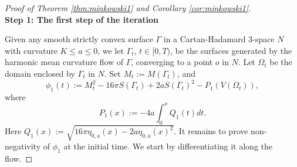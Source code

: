 \documentclass[11pt]{amsart}
\theoremstyle{definition}
\theoremstyle{remark}
\numberwithin{equation}{section}
\begin{document}
\begin{proof}[Proof of Theorem \ref{thm:minkowski1} and Corollary \ref{cor:minkowski1}]
	\hfill\\
	\textbf{Step 1: The first step of the iteration}
	
	Given any smooth strictly convex surface $\Gamma$ in a Cartan-Hadamard 3-space $N$ with curvature $K\leq a\leq 0$, we let $\Gamma_t$, $t\in[0,T)$, be the surfaces generated by the harmonic mean curvature flow of $\Gamma$, converging to a point $o$ in $N$. Let $\Omega_t$ be the domain enclosed by $\Gamma_t$ in $N$.
	Set $M_t:=M(\Gamma_t)$, and
	$$
	\phi_1(t):= M_t^2-16\pi S(\Gamma_t) +2a S(\Gamma_t)^2 -  P_1(V(\Omega_t)) ,
	$$
	where 
	\begin{equation}\label{defn:F_1}
		P_1(x):= -4a \int_{0}^{x} Q_1(t) dt.
	\end{equation}
	Here $Q_1(x) := \sqrt{16\pi \eta_{0,a}(x) - 2 a \eta_{0,a}(x)^2}$.
	It remains to prove non-negativity of \(\phi_1\) at the initial time. We start by differentiating it along the flow. 
	

\end{proof}
\end{document}
